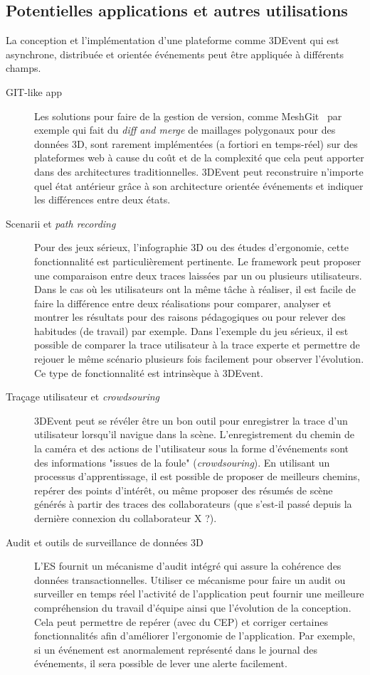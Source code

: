 \subsection{Potentielles applications et autres utilisations}
La conception et l'implémentation d'une plateforme comme 3DEvent qui est 
asynchrone, distribuée et orientée événements peut 
être appliquée à différents champs.
\begin{description}
	\item[GIT-like app] Les solutions pour faire de la gestion de version, comme 
	MeshGit~\cite{Denning2013} par exemple qui fait du
	\textit{diff and merge} de maillages polygonaux pour des données 3D, 
	sont rarement implémentées (a fortiori en 
	temps-réel) sur des plateformes web à cause du coût et de la complexité que 
	cela peut apporter dans des architectures traditionnelles. 3DEvent peut 
	reconstruire n'importe quel état antérieur grâce à son architecture orientée 
	événements et indiquer les différences entre deux états.%
	
	\item[Scenarii et \textit{path recording}] Pour des jeux sérieux, l'infographie 
	3D ou des études d'ergonomie, cette fonctionnalité est particulièrement 
	pertinente. Le \gls{framework} peut proposer une comparaison entre deux traces 
	laissées par un ou plusieurs utilisateurs. Dans le cas où les utilisateurs ont la 
	même tâche à réaliser, il est facile de faire la différence entre deux réalisations 
	pour comparer, analyser et montrer les résultats	pour des raisons 
	pédagogiques ou pour relever des habitudes (de travail) par exemple. Dans 
	l'exemple du jeu sérieux, il est possible de comparer la trace utilisateur à la trace experte 
	et permettre de rejouer le même scénario plusieurs fois facilement pour 
	observer l'évolution. Ce type de fonctionnalité est intrinsèque à 3DEvent. 
	
	\item[Traçage utilisateur et \textit{crowdsouring}] 3DEvent peut se révéler être 
	un bon outil pour enregistrer la trace d'un utilisateur lorsqu'il navigue dans la 
	scène. L'enregistrement du chemin de la caméra et des actions de l'utilisateur 
	sous la forme d'événements sont des informations 
	"issues de la foule" (\textit{crowdsouring}). En utilisant un processus 
	d'apprentissage, il est possible de proposer de meilleurs chemins, repérer des 
	points d'intérêt, ou même proposer des résumés de scène générés à partir des 
	traces des collaborateurs (que s'est-il passé depuis la dernière connexion du 
	collaborateur X ?).
	\item[Audit et outils de surveillance de données 3D] L'\gls{ES} fournit un 
	mécanisme 
	d'audit intégré qui assure la cohérence des données transactionnelles. Utiliser 
	ce mécanisme pour faire un audit ou surveiller en temps réel l'activité de 
	l'application peut fournir une meilleure compréhension du travail d'équipe ainsi 
	que l'évolution de la conception. Cela peut permettre de repérer (avec du 
	\gls{CEP}) et corriger certaines fonctionnalités afin d'améliorer l'ergonomie de 
	l'application. Par exemple, si un événement est anormalement représenté dans 
	le journal des événements, il sera possible de lever une alerte facilement.
\end{description}
